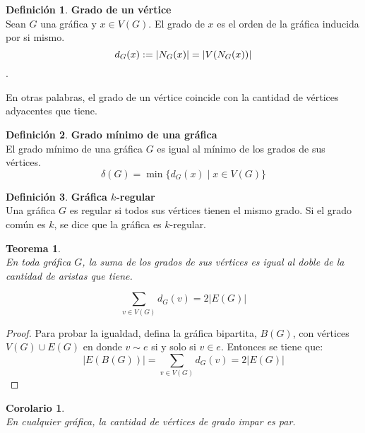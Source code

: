 \documentclass[11pt]{book}
\newtheorem{theorem}{Teorema}
\newtheorem{corollary}{Corolario}
\theoremstyle{definition}
\newtheorem{definition}{Definición}
\begin{document}
\begin{definition}\textbf{Grado de un vértice}\\
  Sean $G$ una gráfica y $x\in V(G)$. El grado de $x$ es el orden de la gráfica inducida por si mismo.
 $$d_G(x)\index{$d_G(x)$}:=|N_G(x)|=|V(N_G(x))|$$.
\end{definition}
En otras palabras, el grado de un vértice coincide con la cantidad de vértices adyacentes que tiene.

\begin{definition}\textbf{Grado mínimo de una gráfica}\\
  El grado mínimo de una gráfica $G$  es igual al mínimo de los grados de sus vértices.
$$\delta(G)=\min
  \{d_G(x)\mid x\in V(G)\}$$
\end{definition}



\begin{definition}\textbf{Gráfica $k$-regular}\\
  Una gráfica $G$ es regular si todos sus vértices tienen el mismo
  grado. Si el grado común es $k$, se dice que la gráfica es
  $k$-regular.
\end{definition}


\begin{theorem}\textbf{}\\
  \label{teogradoaristas} En toda gráfica $G$, la suma de los grados de sus vértices es igual al doble de la cantidad de aristas que tiene.

\begin{equation*}
  \sum_{v\in
    V(G)}d_G(v)=2|E(G)|
\end{equation*}
\end{theorem}

\begin{proof} Para probar la igualdad, defina la gráfica bipartita, $B(G)$, con vértices
$V(G)\cup E(G)$ en donde $v\sim e$ si y solo si $v\in e$. Entonces se
tiene que:
\begin{equation*}
  |E(B(G))| = \sum_{v\in V(G)}d_G(v)=2|E(G)|
\end{equation*}
\end{proof}

\begin{corollary}\textbf{}\\
  \label{gradoparesimpar} En cualquier gráfica, la cantidad de
  vértices de grado impar es par.
\end{corollary}
\end{document}
